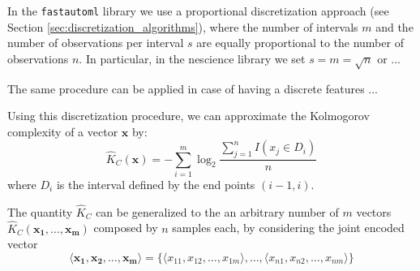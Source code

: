 In the \texttt{fastautoml} library we use a proportional discretization approach (see Section \ref{sec:discretization_algorithms}), where the number of intervals $m$ and the number of observations per interval $s$ are equally proportional to the number of observations $n$. In particular, in the nescience library we set $s = m = \sqrt{n}$ or ...

The same procedure can be applied in case of having a discrete features ...

Using this discretization procedure, we can approximate the Kolmogorov complexity of a vector $\mathbf{x}$ by:
\[
\hat{K}_C(\mathbf{x}) = - \sum_{i=1}^m \log_2{ \frac{ \sum_{j=1}^n I(x_j \in D_i)} {n} } 
\]
where $D_i$ is the interval defined by the end points $(i-1, i)$.

The quantity $\hat{K}_C$ can be generalized to the an arbitrary number of $m$ vectors $\hat{K}_C(\mathbf{x_1}, \ldots, \mathbf{x_m})$ composed by $n$ samples each, by considering the joint encoded vector
\[
\langle \mathbf{x_1}, \mathbf{x_2}, \ldots, \mathbf{x_m} \rangle = \{ \langle x_{11}, x_{12}, \ldots, x_{1m} \rangle, \ldots, \langle x_{n1}, x_{n2}, \ldots, x_{nm} \rangle \}
\]

